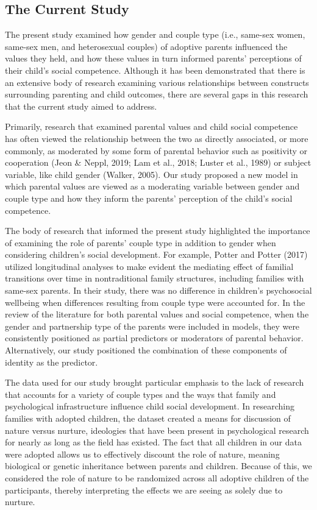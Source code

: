 \documentclass[man]{apa6}
\begin{document}
\hypertarget{the-current-study}{%
\subsection{The Current Study}\label{the-current-study}}

The present study examined how gender and couple type (i.e., same-sex women, same-sex men, and heterosexual couples) of adoptive parents influenced the values they held, and how these values in turn informed parents' perceptions of their child's social competence. Although it has been demonstrated that there is an extensive body of research examining various relationships between constructs surrounding parenting and child outcomes, there are several gaps in this research that the current study aimed to address.

Primarily, research that examined parental values and child social competence has often viewed the relationship between the two as directly associated, or more commonly, as moderated by some form of parental behavior such as positivity or cooperation (Jeon \& Neppl, 2019; Lam et al., 2018; Luster et al., 1989) or subject variable, like child gender (Walker, 2005). Our study proposed a new model in which parental values are viewed as a moderating variable between gender and couple type and how they inform the parents' perception of the child's social competence.

The body of research that informed the present study highlighted the importance of examining the role of parents' couple type in addition to gender when considering children's social development. For example, Potter and Potter (2017) utilized longitudinal analyses to make evident the mediating effect of familial transitions over time in nontraditional family structures, including families with same-sex parents. In their study, there was no difference in children's psychosocial wellbeing when differences resulting from couple type were accounted for. In the review of the literature for both parental values and social competence, when the gender and partnership type of the parents were included in models, they were consistently positioned as partial predictors or moderators of parental behavior. Alternatively, our study positioned the combination of these components of identity as the predictor.

The data used for our study brought particular emphasis to the lack of research that accounts for a variety of couple types and the ways that family and psychological infrastructure influence child social development. In researching families with adopted children, the dataset created a means for discussion of nature versus nurture, ideologies that have been present in psychological research for nearly as long as the field has existed. The fact that all children in our data were adopted allows us to effectively discount the role of nature, meaning biological or genetic inheritance between parents and children. Because of this, we considered the role of nature to be randomized across all adoptive children of the participants, thereby interpreting the effects we are seeing as solely due to nurture.
\end{document}
